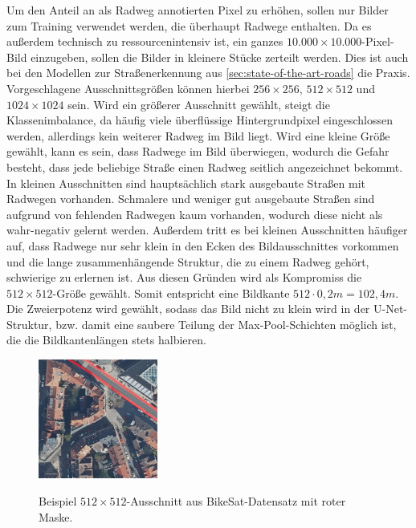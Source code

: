 Um den Anteil an als Radweg annotierten Pixel zu erhöhen, sollen nur Bilder zum Training verwendet werden,
die überhaupt Radwege enthalten. Da es außerdem technisch zu ressourcenintensiv ist, ein ganzes 
$10.000{\times}10.000$-Pixel-Bild einzugeben, sollen die Bilder in kleinere Stücke zerteilt werden. 
Dies ist auch bei den Modellen zur Straßenerkennung aus \autoref{sec:state-of-the-art-roads} die Praxis. 
Vorgeschlagene Ausschnittsgrößen können hierbei $256{\times}256$, $512{\times}512$ und $1024{\times}1024$ sein. 
Wird ein größerer Ausschnitt gewählt, steigt die Klassenimbalance, da häufig viele überflüssige 
Hintergrundpixel eingeschlossen werden, allerdings kein weiterer Radweg im Bild liegt. 
Wird eine kleine Größe gewählt, kann es sein, dass Radwege im Bild überwiegen, 
wodurch die Gefahr besteht, dass jede beliebige Straße einen Radweg seitlich angezeichnet bekommt. 
In kleinen Ausschnitten sind hauptsächlich stark ausgebaute Straßen mit Radwegen vorhanden. 
Schmalere und weniger gut ausgebaute Straßen sind aufgrund von fehlenden Radwegen kaum vorhanden, wodurch diese nicht als wahr-negativ gelernt werden.  
Außerdem tritt es bei kleinen Ausschnitten häufiger auf, dass Radwege nur sehr klein in den Ecken des Bildausschnittes
vorkommen und die lange zusammenhängende Struktur, die zu einem Radweg gehört, schwierige zu erlernen ist. 
Aus diesen Gründen wird als Kompromiss die $512{\times}512$-Größe gewählt. Somit entspricht eine Bildkante 
$512 \cdot 0,2m = 102,4m$. Die Zweierpotenz wird gewählt, 
sodass das Bild nicht zu klein wird in der U-Net-Struktur, bzw. damit eine saubere Teilung der 
Max-Pool-Schichten möglich ist, die die Bildkantenlängen stets halbieren. 

\begin{figure}
	\centering
	\vspace{-20pt} %
	\includegraphics[width=0.35\textwidth]{Bilder/cut-example.jpg}
	\vspace{-5pt}
	\caption[Beispiel $512{\times}512$-Ausschnitt aus BikeSat-Datensatz mit roter Maske.]{\unskip}
	Beispiel $512{\times}512$-Ausschnitt aus BikeSat-Datensatz mit roter Maske.
	\label{fig:cut-example}
	\vspace{-20pt}
\end{figure}


